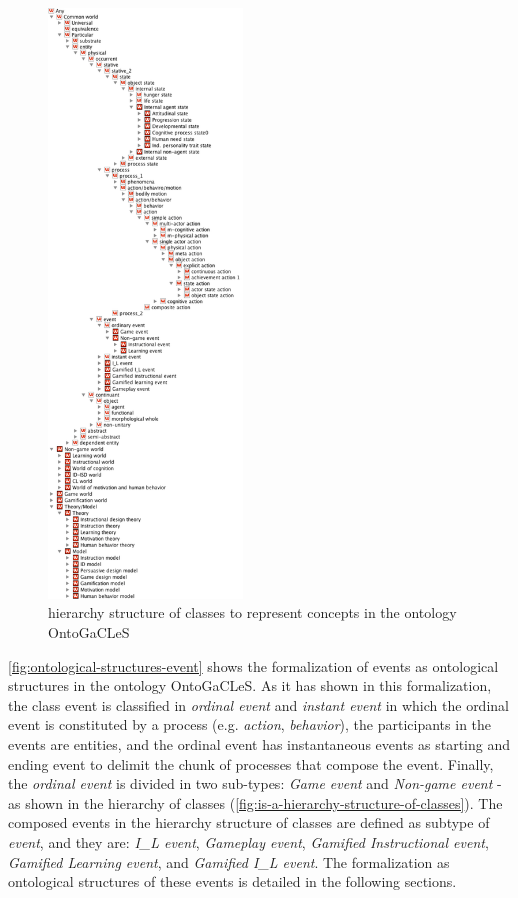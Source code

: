 \begin{figure}[!htb]
 \caption{ hierarchy structure of classes to represent concepts in the ontology OntoGaCLeS}
 \label{fig:is-a-hierarchy-structure-of-classes}
 \centering
 \includegraphics[width=0.46\textwidth]{images/chap-ontogacles2/is-a-hierarchy-structure-of-classes.png}
 \fautor
\end{figure}
\newpage

\autoref{fig:ontological-structures-event} shows the formalization of events as ontological structures in the ontology OntoGaCLeS.
As it has shown in this formalization, the class event is classified in \emph{ordinal event} and \emph{instant event} in which the ordinal event is constituted by a process (e.g. \emph{action}, \emph{behavior}), the participants in the events are entities, and the ordinal event has instantaneous events as starting and ending event to delimit the chunk of processes that compose the event. 
Finally, the \emph{ordinal event} is divided in two sub-types: \emph{Game event} and \emph{Non-game event} - as shown in the  hierarchy of classes (\autoref{fig:is-a-hierarchy-structure-of-classes}).
The composed events in the  hierarchy structure of classes are defined as subtype of \emph{event}, and they are: \emph{I\_L event}, \emph{Gameplay event}, \emph{Gamified Instructional event}, \emph{Gamified Learning event}, and \emph{Gamified I\_L event}.
The formalization as ontological structures of these events is detailed in the following sections.

